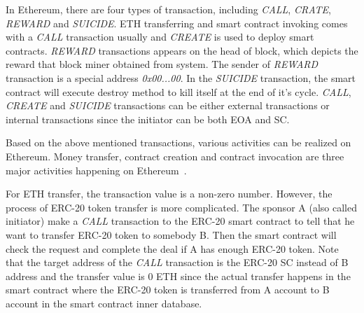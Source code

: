 In Ethereum, there are four types of transaction, including \emph{CALL}, \emph{CRATE}, \emph{REWARD} and \emph{SUICIDE}. ETH transferring and smart contract invoking comes with a \emph{CALL} transaction usually and \emph{CREATE} is used to deploy smart contracts. \emph{REWARD} transactions appears on the head of block, which depicts the reward that block miner obtained from system. The sender of \emph{REWARD} transaction is a special address \emph{0x00...00}. In the \emph{SUICIDE} transaction, the smart contract will execute destroy method to kill itself at the end of it's cycle. \emph{CALL}, \emph{CREATE} and \emph{SUICIDE} transactions can be either external transactions or internal transactions since the initiator can be both EOA and SC.


Based on the above mentioned transactions, various activities can be realized on Ethereum. Money transfer, contract creation and contract invocation are three major activities happening on Ethereum~\cite{chen2018infocom}. %


For ETH transfer, the transaction value is a non-zero number. However, the process of ERC-20 token transfer is more complicated. The sponsor A (also called initiator) make a \emph{CALL} transaction to the ERC-20 smart contract to tell that he want to transfer ERC-20 token to somebody B. Then the smart contract will check the request and complete the deal if A has enough ERC-20 token. Note that the target address of the \emph{CALL} transaction is the ERC-20 SC instead of B address and the transfer value is $0$ ETH since the actual transfer happens in the smart contract where the ERC-20 token is transferred from A account to B account in the smart contract inner database. 



